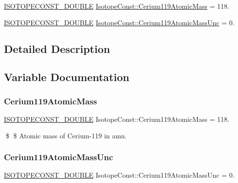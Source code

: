 \begin{DoxyCompactItemize}
\item 
\mbox{\hyperlink{group___isotope_const-_macros_ga8f45a7272ce02c0b4c65c44636ed719a}{I\+S\+O\+T\+O\+P\+E\+C\+O\+N\+S\+T\+\_\+\+D\+O\+U\+B\+LE}} \mbox{\hyperlink{group___isotope_const-_cerium-_ce119_ga8f34748ec68d8ce2adf70294dd3dbd66}{Isotope\+Const\+::\+Cerium119\+Atomic\+Mass}} = 118.
\item 
\mbox{\hyperlink{group___isotope_const-_macros_ga8f45a7272ce02c0b4c65c44636ed719a}{I\+S\+O\+T\+O\+P\+E\+C\+O\+N\+S\+T\+\_\+\+D\+O\+U\+B\+LE}} \mbox{\hyperlink{group___isotope_const-_cerium-_ce119_gaf0e4ae77ed0c86be743bff1bc15c4a9c}{Isotope\+Const\+::\+Cerium119\+Atomic\+Mass\+Unc}} = 0.
\end{DoxyCompactItemize}


\subsection{Detailed Description}


\subsection{Variable Documentation}
\mbox{\label{group___isotope_const-_cerium-_ce119_ga8f34748ec68d8ce2adf70294dd3dbd66}} 
\subsubsection{\texorpdfstring{Cerium119\+Atomic\+Mass}{Cerium119AtomicMass}}
{\footnotesize\ttfamily \mbox{\hyperlink{group___isotope_const-_macros_ga8f45a7272ce02c0b4c65c44636ed719a}{I\+S\+O\+T\+O\+P\+E\+C\+O\+N\+S\+T\+\_\+\+D\+O\+U\+B\+LE}} Isotope\+Const\+::\+Cerium119\+Atomic\+Mass = 118.}

\$ \$ Atomic mass of Cerium-\/119 in amu. \mbox{\label{group___isotope_const-_cerium-_ce119_gaf0e4ae77ed0c86be743bff1bc15c4a9c}} 
\subsubsection{\texorpdfstring{Cerium119\+Atomic\+Mass\+Unc}{Cerium119AtomicMassUnc}}
{\footnotesize\ttfamily \mbox{\hyperlink{group___isotope_const-_macros_ga8f45a7272ce02c0b4c65c44636ed719a}{I\+S\+O\+T\+O\+P\+E\+C\+O\+N\+S\+T\+\_\+\+D\+O\+U\+B\+LE}} Isotope\+Const\+::\+Cerium119\+Atomic\+Mass\+Unc = 0.}


